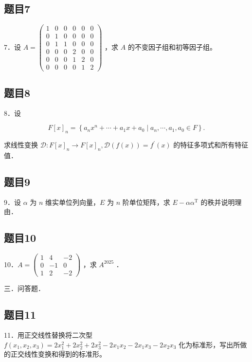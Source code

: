 \documentclass{article}
\begin{document}
\subsection{题目7}
7．设 \(A=\left(\begin{array}{llllll}1 & 0 & 0 & 0 & 0 & 0 \\ 0 & 1 & 0 & 0 & 0 & 0 \\ 0 & 1 & 1 & 0 & 0 & 0 \\ 0 & 0 & 0 & 2 & 0 & 0 \\ 0 & 0 & 0 & 1 & 2 & 0 \\ 0 & 0 & 0 & 0 & 1 & 2\end{array}\right)\) ，求 \(A\) 的不变因子组和初等因子组。

\subsection{题目8}
8．设

\[
F[x]_{n}=\left\{a_{n} x^{n}+\cdots+a_{1} x+a_{0} \mid a_{n}, \cdots, a_{1}, a_{0} \in F\right\} .
\]

求线性变换 \(\mathcal{D}: F[x]_{n} \rightarrow F[x]_{n}, \mathcal{D}(f(x))=f^{\prime}(x)\) 的特征多项式和所有特征值．

\subsection{题目9}
9．设 \(\alpha\) 为 \(n\) 维实单位列向量，\(E\) 为 \(n\) 阶单位矩阵，求 \(E-\alpha \alpha^{\mathrm{T}}\) 的秩并说明理由．

\subsection{题目10}
10．\(A=\left(\begin{array}{ccc}1 & 4 & -2 \\ 0 & -1 & 0 \\ 1 & 2 & -2\end{array}\right)\) ，求 \(A^{2025}\) ．

三．问答题．\\

\subsection{题目11}
11．用正交线性替换将二次型 \(f\left(x_{1}, x_{2}, x_{3}\right)=2 x_{1}^{2}+2 x_{2}^{2}+2 x_{3}^{2}-2 x_{1} x_{2}-2 x_{1} x_{3}-2 x_{2} x_{3}\) 化为标准形，写出所做的正交线性变换和得到的标准形。\\
\end{document}
